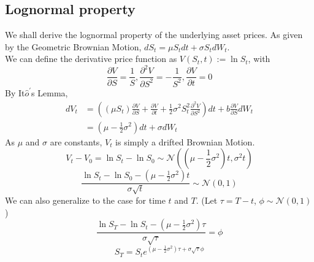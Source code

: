 \newpage
\subsection{Lognormal property}
We shall derive the lognormal property of the underlying asset prices.
As given by the Geometric Brownian Motion, $dS_{t}  = \mu S_{t}dt + \sigma S_{t} dW_{t}$.\\
We can define the derivative price function as $V(S_{t}, t) := \ln{S_{t}}$, with \\
$$\frac{\partial V}{\partial S} = \frac{1}{S}, \frac{\partial^{2} V}{\partial S^{2}} = -\frac{1}{S^{2}} , \frac{\partial V}{\partial t} = 0$$
By It$\hat{o}^{\prime}$s Lemma,
\begin{equation*}
\begin{split}
dV_{t}
&= ((\mu S_{t})\frac{\partial V}{\partial S} + \frac{\partial V}{\partial t} + \frac{1}{2}\sigma^{2}S_{t}^{2}\frac{\partial^{2} V}{\partial S^{2}})dt + b\frac{\partial V}{\partial S}dW_{t}\\
&= (\mu - \frac{1}{2}\sigma^{2})dt + \sigma dW_{t}
\end{split}
\end{equation*}
As $\mu$ and $\sigma$ are constants, $V_{t}$ is simply a drifted Brownian Motion.\\
$$V_{t} - V_{0} = \ln{S_{t}} - \ln{S_{0}} \sim \mathcal{N}((\mu - \frac{1}{2}\sigma^{2})t, \sigma^{2}t)$$
$$\frac{\ln{S_{t}} - \ln{S_{0}} - (\mu - \frac{1}{2}\sigma^{2})t}{\sigma\sqrt{t}} \sim \mathcal{N}(0,1)$$
We can also generalize to the case for time $t$ and $T$. (Let $\tau = T - t$, $\phi \sim \mathcal{N}(0,1)$)
$$\frac{\ln{S_{T}} - \ln{S_{t}} - (\mu - \frac{1}{2}\sigma^{2})\tau}{\sigma\sqrt{\tau}} = \phi $$
$$S_{T} = S_{t}e^{(\mu - \frac{1}{2}\sigma^{2})\tau + \sigma\sqrt{\tau}\phi}$$
\newpage

